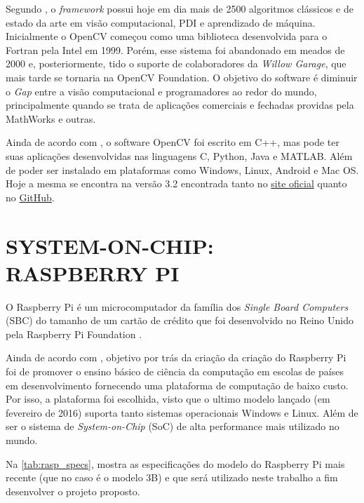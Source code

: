 Segundo , o \emph{framework} possui hoje em dia mais de 2500 algoritmos clássicos e de estado da arte em visão computacional, PDI e aprendizado de máquina. Inicialmente o OpenCV começou como uma biblioteca desenvolvida para o Fortran pela Intel em 1999. Porém, esse sistema foi abandonado em meados de 2000 e, posteriormente, tido o suporte de colaboradores da \emph{Willow Garage}, que mais tarde se tornaria na OpenCV Foundation. O objetivo do software é diminuir o \emph{Gap} entre a visão computacional e programadores ao redor do mundo, principalmente quando se trata de aplicações comerciais e fechadas providas pela MathWorks e outras.

Ainda de acordo com , o software OpenCV foi escrito em C++, mas pode ter suas aplicações desenvolvidas nas linguagens C, Python, Java e MATLAB. Além de poder ser instalado em plataformas como Windows, Linux, Android e Mac OS. Hoje a mesma se encontra na versão 3.2 encontrada tanto no \href{http://opencv.org/releases.html}{site oficial} quanto no \href{https://github.com/opencv/opencv}{GitHub}. 

\section{\uppercase{System-on-Chip: Raspberry Pi}}

O Raspberry Pi é um microcomputador da família dos \textit{Single Board Computers} (SBC) do tamanho de um cartão de crédito que foi desenvolvido no Reino Unido pela Raspberry Pi Foundation \cite{pajankar2017}.

Ainda de acordo com , objetivo por trás da criação da criação do Raspberry Pi foi de promover o ensino básico de ciência da computação em escolas de países em desenvolvimento fornecendo uma plataforma de computação de baixo custo. Por isso, a plataforma foi escolhida, visto que o ultimo modelo lançado (em fevereiro de 2016) suporta tanto sistemas operacionais Windows e Linux. Além de ser o sistema de \emph{System-on-Chip} (SoC) de alta performance mais utilizado no mundo.

Na \autoref{tab:rasp_specs}, mostra as especificações do modelo do Raspberry Pi mais recente (que no caso é o modelo 3B) e que será utilizado neste trabalho a fim desenvolver o projeto proposto.

